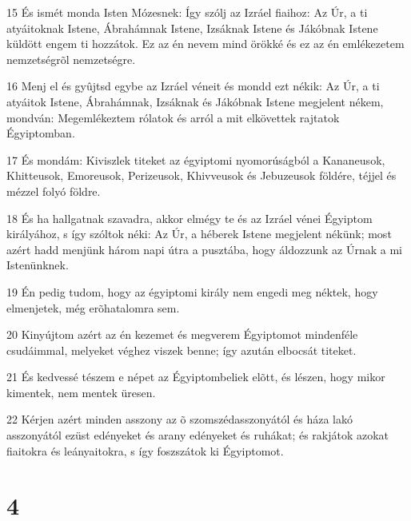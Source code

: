 \par 15 És ismét monda Isten Mózesnek: Így szólj az Izráel fiaihoz: Az Úr, a ti atyáitoknak Istene, Ábrahámnak Istene, Izsáknak Istene és Jákóbnak Istene küldött engem ti hozzátok. Ez az én nevem mind örökké és ez az én emlékezetem nemzetségrõl nemzetségre.
\par 16 Menj el és gyûjtsd egybe az Izráel véneit és mondd ezt nékik: Az Úr, a ti atyáitok Istene, Ábrahámnak, Izsáknak és Jákóbnak Istene megjelent nékem, mondván: Megemlékeztem rólatok és arról a mit elkövettek rajtatok Égyiptomban.
\par 17 És mondám: Kiviszlek titeket az égyiptomi nyomorúságból a Kananeusok, Khitteusok, Emoreusok, Perizeusok, Khivveusok és Jebuzeusok földére, téjjel és mézzel folyó földre.
\par 18 És ha hallgatnak szavadra, akkor elmégy te és az Izráel vénei Égyiptom királyához, s így szóltok néki: Az Úr, a héberek Istene megjelent nékünk; most azért hadd menjünk három napi útra a pusztába, hogy áldozzunk az Úrnak a mi Istenünknek.
\par 19 Én pedig tudom, hogy az égyiptomi király nem engedi meg néktek, hogy elmenjetek, még erõhatalomra sem.
\par 20 Kinyújtom azért az én kezemet és megverem Égyiptomot mindenféle csudáimmal, melyeket véghez viszek benne; így azután elbocsát titeket.
\par 21 És kedvessé tészem e népet az Égyiptombeliek elõtt, és lészen, hogy mikor kimentek, nem mentek üresen.
\par 22 Kérjen azért minden asszony az õ szomszédasszonyától és háza lakó asszonyától ezüst edényeket és arany edényeket és ruhákat; és rakjátok azokat fiaitokra és leányaitokra, s így foszszátok ki Égyiptomot.

\chapter{4}

